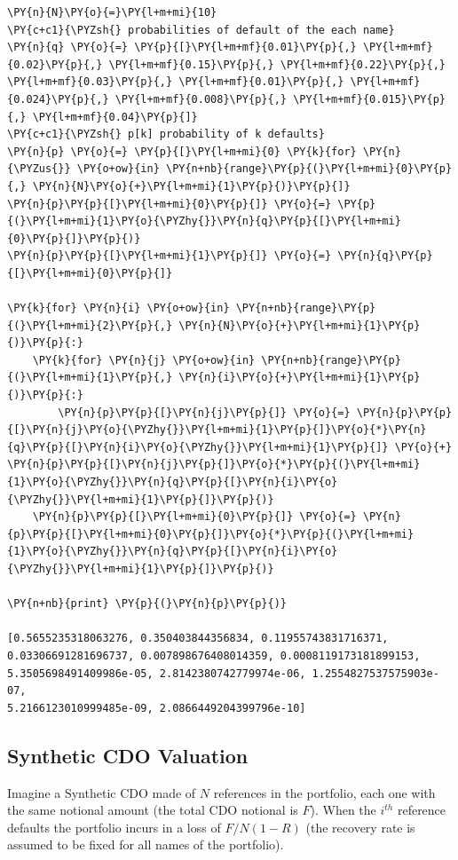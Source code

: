 \begin{tcolorbox}[breakable, size=fbox, boxrule=1pt, pad at break*=1mm,colback=cellbackground, colframe=cellborder]
\begin{Verbatim}[commandchars=\\\{\}]
\PY{n}{N}\PY{o}{=}\PY{l+m+mi}{10}
\PY{c+c1}{\PYZsh{} probabilities of default of the each name}
\PY{n}{q} \PY{o}{=} \PY{p}{[}\PY{l+m+mf}{0.01}\PY{p}{,} \PY{l+m+mf}{0.02}\PY{p}{,} \PY{l+m+mf}{0.15}\PY{p}{,} \PY{l+m+mf}{0.22}\PY{p}{,} \PY{l+m+mf}{0.03}\PY{p}{,} \PY{l+m+mf}{0.01}\PY{p}{,} \PY{l+m+mf}{0.024}\PY{p}{,} \PY{l+m+mf}{0.008}\PY{p}{,} \PY{l+m+mf}{0.015}\PY{p}{,} \PY{l+m+mf}{0.04}\PY{p}{]}
\PY{c+c1}{\PYZsh{} p[k] probability of k defaults}
\PY{n}{p} \PY{o}{=} \PY{p}{[}\PY{l+m+mi}{0} \PY{k}{for} \PY{n}{\PYZus{}} \PY{o+ow}{in} \PY{n+nb}{range}\PY{p}{(}\PY{l+m+mi}{0}\PY{p}{,} \PY{n}{N}\PY{o}{+}\PY{l+m+mi}{1}\PY{p}{)}\PY{p}{]}
\PY{n}{p}\PY{p}{[}\PY{l+m+mi}{0}\PY{p}{]} \PY{o}{=} \PY{p}{(}\PY{l+m+mi}{1}\PY{o}{\PYZhy{}}\PY{n}{q}\PY{p}{[}\PY{l+m+mi}{0}\PY{p}{]}\PY{p}{)}
\PY{n}{p}\PY{p}{[}\PY{l+m+mi}{1}\PY{p}{]} \PY{o}{=} \PY{n}{q}\PY{p}{[}\PY{l+m+mi}{0}\PY{p}{]}
		
\PY{k}{for} \PY{n}{i} \PY{o+ow}{in} \PY{n+nb}{range}\PY{p}{(}\PY{l+m+mi}{2}\PY{p}{,} \PY{n}{N}\PY{o}{+}\PY{l+m+mi}{1}\PY{p}{)}\PY{p}{:}
    \PY{k}{for} \PY{n}{j} \PY{o+ow}{in} \PY{n+nb}{range}\PY{p}{(}\PY{l+m+mi}{1}\PY{p}{,} \PY{n}{i}\PY{o}{+}\PY{l+m+mi}{1}\PY{p}{)}\PY{p}{:}
        \PY{n}{p}\PY{p}{[}\PY{n}{j}\PY{p}{]} \PY{o}{=} \PY{n}{p}\PY{p}{[}\PY{n}{j}\PY{o}{\PYZhy{}}\PY{l+m+mi}{1}\PY{p}{]}\PY{o}{*}\PY{n}{q}\PY{p}{[}\PY{n}{i}\PY{o}{\PYZhy{}}\PY{l+m+mi}{1}\PY{p}{]} \PY{o}{+} \PY{n}{p}\PY{p}{[}\PY{n}{j}\PY{p}{]}\PY{o}{*}\PY{p}{(}\PY{l+m+mi}{1}\PY{o}{\PYZhy{}}\PY{n}{q}\PY{p}{[}\PY{n}{i}\PY{o}{\PYZhy{}}\PY{l+m+mi}{1}\PY{p}{]}\PY{p}{)}
    \PY{n}{p}\PY{p}{[}\PY{l+m+mi}{0}\PY{p}{]} \PY{o}{=} \PY{n}{p}\PY{p}{[}\PY{l+m+mi}{0}\PY{p}{]}\PY{o}{*}\PY{p}{(}\PY{l+m+mi}{1}\PY{o}{\PYZhy{}}\PY{n}{q}\PY{p}{[}\PY{n}{i}\PY{o}{\PYZhy{}}\PY{l+m+mi}{1}\PY{p}{]}\PY{p}{)}
		
\PY{n+nb}{print} \PY{p}{(}\PY{n}{p}\PY{p}{)}

[0.5655235318063276, 0.350403844356834, 0.11955743831716371,
0.03306691281696737, 0.007898676408014359, 0.0008119173181899153,
5.3505698491409986e-05, 2.8142380742779974e-06, 1.2554827537575903e-07,
5.2166123010999485e-09, 2.0866449204399796e-10]
\end{Verbatim}
\end{tcolorbox}

\subsection{Synthetic CDO Valuation}
Imagine a Synthetic CDO made of $N$ references in the portfolio, each one with the same notional amount (the total CDO notional is $F$).
When the $i^{th}$ reference defaults the portfolio incurs in a loss of $F/N(1-R)$ (the recovery rate is assumed to be fixed for all names of the portfolio).

